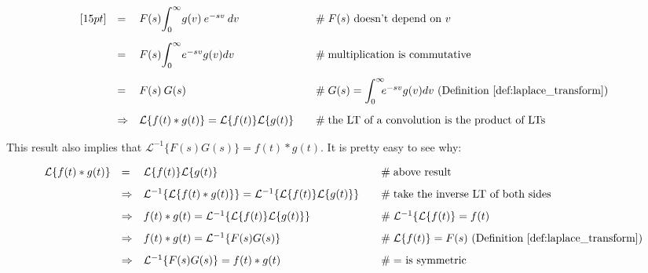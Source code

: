 \documentclass{article}
\theoremstyle{definition}
\begin{document}
\begin{equation*}
\begin{array}{lllll}
[15pt]
&=& F(s) \mathlarger{\int}^\infty_0 g(v) \: e^{-sv} \: dv                                                                               &\quad \mathrel{\#} \text{$F(s)$ doesn't depend on $v$}                                                                            \\
[15pt]
&=& F(s) \mathlarger{\int}^\infty_0 e^{-sv}  g(v) dv                                                                                    &\quad \mathrel{\#} \text{multiplication is commutative}                                                                              \\
[15pt]
&=& F(s)\:G(s)                                                                                                                   &\quad \mathrel{\#} G(s) = \mathlarger{\int}^\infty_0 \!\! e^{-sv}  g(v) dv \text{ (Definition \ref{def:laplace_transform})}      \\   
[15pt]
&\Rightarrow& \mathcal{L}\{f(t) \ast g(t)\} = \mathcal{L}\{f(t)\}\mathcal{L}\{g(t)\}                                        &\quad \mathrel{\#} \text{the LT of a convolution is the product of LTs}                                                       \\
\end{array}
\end{equation*}

\bigskip
\bigskip
\noindent
This result also implies that $\mathcal{L}^{-1}\{F(s) G(s)\} =
f(t) \ast g(t)$. It is pretty easy to see why:

\bigskip
\begin{equation*}
\begin{array}{lllll}
\mathcal{L}\{f(t) \ast g(t)\} 
&=& \mathcal{L}\{f(t)\}\mathcal{L}\{g(t)\}                                                                                                                               &\quad \mathrel{\#} \text{above result}                                      \\
[8pt]
&\Rightarrow& \mathcal{L}^{-1}\{\mathcal{L}\{f(t) \ast g(t)\}\} =  \mathcal{L}^{-1}\{\mathcal{L}\{f(t)\}\mathcal{L}\{g(t)\}\}     &\quad \mathrel{\#} \text{take the inverse LT of both sides}       \\
[8pt]
&\Rightarrow& f(t) \ast g(t) =  \mathcal{L}^{-1}\{\mathcal{L}\{f(t)\}\mathcal{L}\{g(t)\}\}                                                          &\quad \mathrel{\#}   \mathcal{L}^{-1}\{\mathcal{L}\{f(t)\} = f(t)  \\
[8pt]
&\Rightarrow& f(t) \ast g(t) =  \mathcal{L}^{-1}\{F(s) G(s)\}                                                                                                  &\quad \mathrel{\#} \text{$\mathcal{L}\{f(t)\} = F(s)$ (Definition \ref{def:laplace_transform})} \\
[8pt]
&\Rightarrow& \mathcal{L}^{-1}\{F(s) G(s)\} = f(t) \ast g(t)                                                                                                  &\quad \mathrel{\#} \text{$=$ is symmetric}
\end{array}
\end{equation*}
%
%
%
\end{document}
